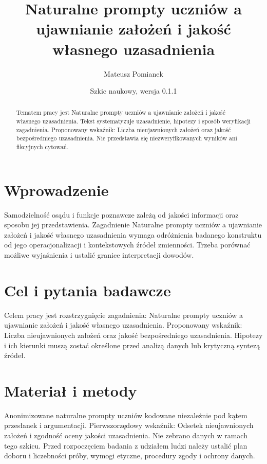 \documentclass[11pt,a4paper]{article}
\title{Naturalne prompty uczniów a ujawnianie założeń i jakość własnego uzasadnienia}
\author{Mateusz Pomianek}
\date{Szkic naukowy, wersja 0.1.1}
\begin{document}
\maketitle

\begin{abstract}

Tematem pracy jest Naturalne prompty uczniów a ujawnianie założeń i jakość własnego uzasadnienia. Tekst systematyzuje uzasadnienie, hipotezy i sposób weryfikacji zagadnienia. Proponowany wskaźnik: Liczba nieujawnionych założeń oraz jakość bezpośredniego uzasadnienia. Nie przedstawia się niezweryfikowanych wyników ani fikcyjnych cytowań.

\end{abstract}

\section{Wprowadzenie}

Samodzielność osądu i funkcje poznawcze zależą od jakości informacji oraz sposobu jej przedstawienia. Zagadnienie Naturalne prompty uczniów a ujawnianie założeń i jakość własnego uzasadnienia wymaga odróżnienia badanego konstruktu od jego operacjonalizacji i kontekstowych źródeł zmienności. Trzeba porównać możliwe wyjaśnienia i ustalić granice interpretacji dowodów.

\section{Cel i pytania badawcze}

Celem pracy jest rozstrzygnięcie zagadnienia: Naturalne prompty uczniów a ujawnianie założeń i jakość własnego uzasadnienia. Proponowany wskaźnik: Liczba nieujawnionych założeń oraz jakość bezpośredniego uzasadnienia. Hipotezy i ich kierunki muszą zostać określone przed analizą danych lub krytyczną syntezą źródeł.

\section{Materiał i metody}

Anonimizowane naturalne prompty uczniów kodowane niezależnie pod kątem przesłanek i argumentacji. Pierwszorzędowy wskaźnik: Odsetek nieujawnionych założeń i zgodność oceny jakości uzasadnienia. Nie zebrano danych w ramach tego szkicu. Przed rozpoczęciem badania z udziałem ludzi należy ustalić plan doboru i liczebności próby, wymogi etyczne, procedury zgody i ochrony danych.
\end{document}
